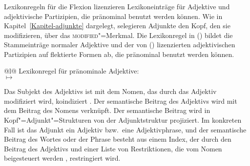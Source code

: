 {Lexikonregeln für die Flexion lizenzieren Lexikoneinträge für Adjektive und adjektivische
Partizipien, die pränominal benutzt werden können. Wie in Kapitel~\ref{Kapitel-adjunkte}
dargelegt, selegieren Adjunkte den Kopf, den sie modifizieren, über das
\textsc{modified}"=Merkmal. Die Lexikonregel in () bildet die Stammeinträge
normaler Adjektive und der von () lizenzierten adjektivischen Partizipien
auf flektierte Formen ab, die pränominal benutzt werden können.
%
\eas
\label{lr-prenom-adj}
\begin{tabular}[t]{@{}l@{}}
Lexikonregel für pränominale Adjektive:\\
 $\mapsto$\\
\end{tabular}
\zs
%
Das Subjekt des Adjektivs ist mit dem Nomen, das durch das Adjektiv modifiziert wird, koindiziert .
Der semantische Beitrag des Adjektivs  wird mit dem Beitrag des Nomens  verknüpft. 
Der semantische Beitrag wird in Kopf"=Adjunkt"=Strukturen von der Adjunktstruktur projiziert.
Im konkreten Fall ist das Adjunkt ein Adjektiv bzw.\ eine Adjektivphrase, und der
semantische Beitrag des Wortes oder der Phrase besteht aus einem Index, der durch den Beitrag
des Adjektivs  und einer Liste von Restriktionen, die vom Nomen beigesteuert werden , restringiert wird.

}
